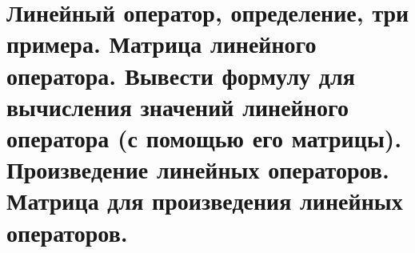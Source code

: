 \section{
    Линейный оператор, определение, три 
    примера. Матрица линейного оператора. 
    Вывести формулу для вычисления значений 
    линейного оператора (с помощью его 
    матрицы). Произведение линейных 
    операторов. Матрица для произведения 
    линейных операторов.
 }




\newpage





\newpage




\newpage



